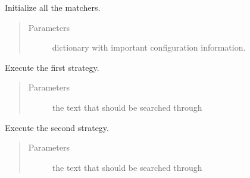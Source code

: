 \documentclass[letterpaper,10pt,english]{sphinxmanual}
\begin{document}
\begin{fulllineitems}
\begin{fulllineitems}
\end{fulllineitems}


\begin{fulllineitems}
\label{\detokenize{api:health_claims.HealthClaims.__init__}}
Initialize all the matchers.
\begin{quote}\begin{description}
\item[{Parameters}] \leavevmode
{} \textendash{} dictionary with important configuration information.

\end{description}\end{quote}

\end{fulllineitems}


\begin{fulllineitems}
\label{\detokenize{api:health_claims.HealthClaims.check_disease_substances}}
Execute the first strategy.
\begin{quote}\begin{description}
\item[{Parameters}] \leavevmode
{} \textendash{} the text that should be searched through

\end{description}\end{quote}

\end{fulllineitems}


\begin{fulllineitems}
\label{\detokenize{api:health_claims.HealthClaims.check_fix_patterns}}
Execute the second strategy.
\begin{quote}\begin{description}
\item[{Parameters}] \leavevmode
{} \textendash{} the text that should be searched through


\end{description}
\end{quote}
\end{fulllineitems}
\end{fulllineitems}
\end{document}

